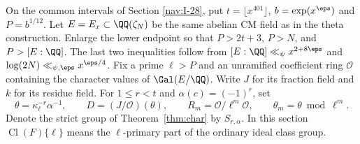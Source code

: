 \documentclass[a4paper,11pt]{article}
\theoremstyle{definition}
\theoremstyle{remark}
\numberwithin{equation}{section}
\newcommand{\Cl}{\operatorname{Cl}}
\newcommand{\OO}{\mathcal O}
\begin{document}
On the common intervals of
Section \ref{nav:I-28},
put \(t=\lfloor x^{401}\rfloor\), \(b=\exp(x^\eps)\) and
\(P=b^{1/12}\). Let \(E=E_x\subset\QQ(\zeta_N)\) be the same
abelian CM field as in the theta construction. Enlarge the
lower endpoint so that \(P>2t+3\), \(P>N\), and \(P>[E:\QQ]\).
The last two inequalities follow from
\([E:\QQ]\ll_\psi x^{2+8\eps}\) and
\(\log(2N)\ll_{\psi,\eps}x^{\eps/4}\).
Fix a prime \(\ell>P\) and an unramified coefficient ring
\(\OO\) containing the character values of \(\Gal(E/\QQ)\).
Write \(J\) for its fraction field and \(k\) for its residue field.
For \(1\le r<t\) and \(\alpha(c)=(-1)^r\), set
\[
  \theta=\kappa_\ell^{-r}\alpha^{-1},\qquad
  D=(J/\OO)(\theta),\qquad R_m=\OO/\ell^m\OO,\qquad
  \theta_m=\theta\bmod\ell^m .
\]
Denote the strict group of Theorem~\ref{thm:char} by
\(S_{r,\alpha}\). In this section \(\Cl(F)\{\ell\}\) means
the \(\ell\)-primary part of the ordinary ideal class group.
\end{document}
